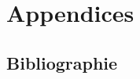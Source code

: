 \documentclass[a4paper,french,nobib,twoside,justified]{tufte-book} %
\begin{document}




\mainmatter
{}













\backmatter

\cleardoublepage
\part*{Appendices}
\appendix %



%


\chapter*{Bibliographie}
\label{sec:references}

\end{document}

